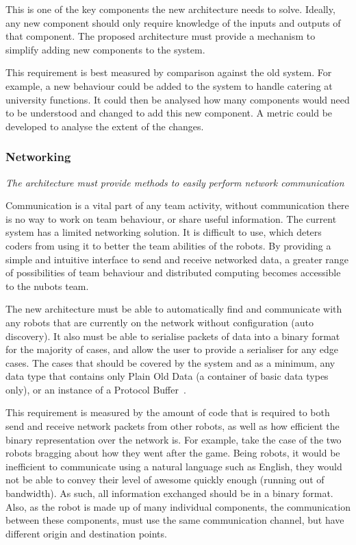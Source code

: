 \documentclass[english,12pt]{scrartcl}
\newcommand{\requirement}[1]{\textit{#1}}
\begin{document}
				This is one of the key components the new architecture needs to solve.
				Ideally, any new component should only require knowledge of the inputs and outputs of that component.
				The proposed architecture must provide a mechanism to simplify adding new components to the system.
	
				This requirement is best measured by comparison against the old system.
				For example, a new behaviour could be added to the system to handle catering at university functions.
				It could then be analysed how many components would need to be understood and changed to add this new component. A metric could be developed to analyse the extent of the changes. 

			\subsubsection{Networking}
				\requirement{The architecture must provide methods to easily perform network
				communication}
	
				Communication is a vital part of any team activity, without communication there is no way to work on team behaviour, or share useful information.
				The current system has a limited networking solution.
				It is difficult to use, which deters coders from using it to better the team abilities of the robots.
				By providing a simple and intuitive interface to send and receive networked data, a greater range of possibilities of team behaviour and distributed computing becomes accessible to the \gls{nubots} team.
	
				The new architecture must be able to automatically find and communicate with any robots that are currently on the network without configuration (auto discovery).
				It also must be able to serialise packets of data into a binary format for the majority of cases, and allow the user to provide a serialiser for any edge cases.
				The cases that should be covered by the system and as a minimum, any data type that contains only Plain Old Data (a container of basic data types only), or an instance of a Protocol Buffer~\cite{protobuf}.
	
				This requirement is measured by the amount of code that is required to both send and receive network packets from other robots, as well as how efficient the binary representation over the network is.
				For example, take the case of the two robots bragging about how they went after the game.
				Being robots, it would be inefficient to communicate using a natural language such as English, they would not be able to convey their level of awesome quickly enough (running out of bandwidth).
				As such, all information exchanged should be in a binary format.
				Also, as the robot is made up of many individual components, the communication between these components, must use the same communication channel, but have different origin and destination points.
\end{document}
